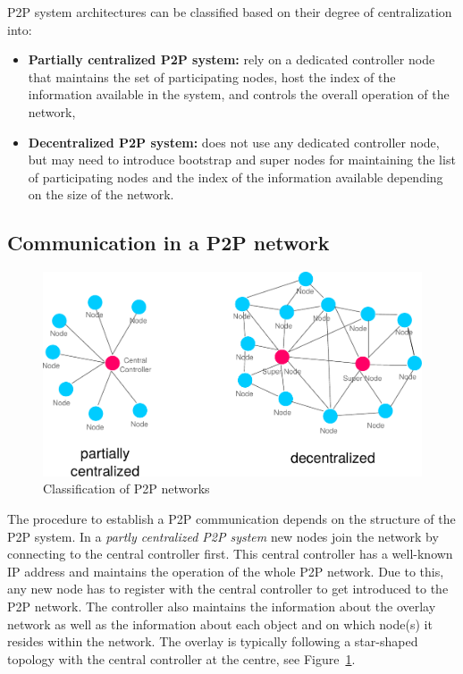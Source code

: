 \gls{P2P} system architectures can be classified based on their degree of centralization into: \@

\begin{itemize}
	\item \textbf{Partially centralized \gls{P2P} system:} rely on a dedicated controller node that maintains the set of participating nodes, host the index of the information available in the system, and controls the overall operation of the network,
	\item \textbf{Decentralized \gls{P2P} system:} does not use any dedicated controller node, but may need to introduce bootstrap and super nodes for maintaining the list of participating nodes and the index of the information available depending on the size of the network.
\end{itemize}


\subsection{Communication in a \gls{P2P} network}
\label{sec:p2p_start_communication}

\begin{figure}[!ht]
	\centering
	\includegraphics[width=0.8\columnwidth]{images/p2p_network_structures.pdf}
	\caption{Classification of \gls{P2P} networks}
	\label{fig:p2p_network_structures}
\end{figure}

The procedure to establish a \gls{P2P} communication depends on the structure of the \gls{P2P} system. In a \emph{partly centralized \gls{P2P} system} new nodes join the network by connecting to the central controller first. This central controller has a well-known \gls{IP} address and maintains the operation of the whole \gls{P2P} network. Due to this, any new node has to register with the central controller to get introduced to the \gls{P2P} network. The controller also maintains the information about the overlay network as well as the information about each object and on which node(s) it resides within the network. The overlay is typically following a star-shaped topology with the central controller at the centre, see Figure~\ref{fig:p2p_network_structures}. \\


